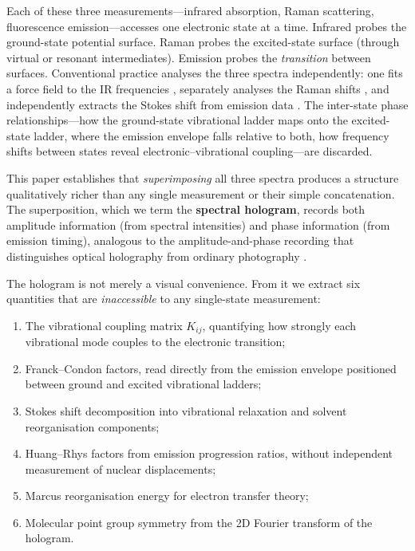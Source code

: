 \documentclass[11pt,a4paper]{article}
\theoremstyle{definition}
\theoremstyle{remark}
\begin{document}
Each of these three measurements---infrared absorption, Raman scattering, fluorescence emission---accesses one electronic state at a time. Infrared probes the ground-state potential surface. Raman probes the excited-state surface (through virtual or resonant intermediates). Emission probes the \emph{transition} between surfaces. Conventional practice analyses the three spectra independently: one fits a force field to the IR frequencies \citep{wilson1955}, separately analyses the Raman shifts \citep{albrecht1961}, and independently extracts the Stokes shift from emission data \citep{stokes1852}. The inter-state phase relationships---how the ground-state vibrational ladder maps onto the excited-state ladder, where the emission envelope falls relative to both, how frequency shifts between states reveal electronic--vibrational coupling---are discarded.

This paper establishes that \emph{superimposing} all three spectra produces a structure qualitatively richer than any single measurement or their simple concatenation. The superposition, which we term the \textbf{spectral hologram}, records both amplitude information (from spectral intensities) and phase information (from emission timing), analogous to the amplitude-and-phase recording that distinguishes optical holography from ordinary photography \citep{bornwolf1999}.

The hologram is not merely a visual convenience. From it we extract six quantities that are \emph{inaccessible} to any single-state measurement:
\begin{enumerate}[label=(\roman*)]
  \item The vibrational coupling matrix $K_{ij}$, quantifying how strongly each vibrational mode couples to the electronic transition;
  \item Franck--Condon factors, read directly from the emission envelope positioned between ground and excited vibrational ladders;
  \item Stokes shift decomposition into vibrational relaxation and solvent reorganisation components;
  \item Huang--Rhys factors from emission progression ratios, without independent measurement of nuclear displacements;
  \item Marcus reorganisation energy for electron transfer theory;
  \item Molecular point group symmetry from the 2D Fourier transform of the hologram.
\end{enumerate}
\end{document}
